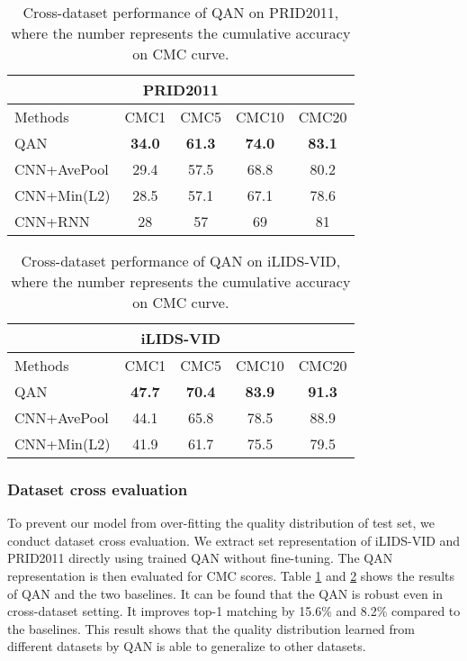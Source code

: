 \documentclass[10pt,twocolumn,letterpaper]{article}
\begin{document}
\begin{table}[ht]
\normalsize
  \centering
  \begin{tabular}{l|c|c|c|c}
    \hline
      \multicolumn{5}{c}{PRID2011}\\
    \hline
       Methods & CMC1 &CMC5&CMC10 & CMC20  \\
    \hline
       QAN 		  & \bf{34.0} & \bf{61.3} & \bf{74.0} & \bf{83.1}  \\
       CNN+AvePool 		& 29.4 & 57.5 & 68.8 & 80.2  \\
       CNN+Min(L2) 		& 28.5 & 57.1 & 67.1 & 78.6  \\
    \hline
    CNN+RNN\cite{wu2016deep} & 28 & 57 & 69 & 81 \\
    \hline
  \end{tabular}
  \caption{Cross-dataset performance of QAN on PRID2011, where the number represents the cumulative accuracy on CMC curve.}
  \label{tab_cross_prid}
\end{table}

\begin{table}[ht]
\normalsize
  \centering
  \begin{tabular}{l|c|c|c|c}
    \hline
      \multicolumn{5}{c}{iLIDS-VID}\\
    \hline
       Methods & CMC1 &CMC5&CMC10 & CMC20  \\
    \hline
       QAN		& \bf{47.7} & \bf{70.4} & \bf{83.9} & \bf{91.3} \\
       CNN+AvePool 		& 44.1 & 65.8 & 78.5 & 88.9 \\
       CNN+Min(L2) 		& 41.9 & 61.7 & 75.5 & 79.5  \\
    \hline
  \end{tabular}
  \caption{Cross-dataset performance of QAN on iLIDS-VID, where the number represents the cumulative accuracy on CMC curve.}
  \label{tab_cross_ilids}
\end{table}

\subsubsection{Dataset cross evaluation} To prevent our model from over-fitting the quality distribution of test set, we conduct dataset cross evaluation. We extract set representation of iLIDS-VID and PRID2011 directly using trained QAN without fine-tuning. The QAN representation is then evaluated for CMC scores. Table \ref{tab_cross_prid} and \ref{tab_cross_ilids} shows the results of QAN and the two baselines. It can be found that the QAN is robust even in cross-dataset setting. It improves top-1 matching by 15.6\% and 8.2\% compared to the baselines. This result shows that the quality distribution learned from different datasets by QAN is able to generalize to other datasets.
\end{document}
